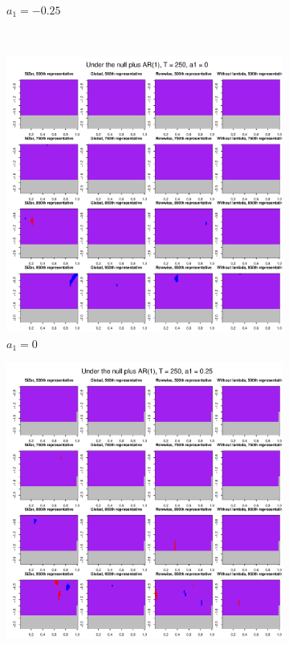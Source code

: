 \documentclass[a4paper,12pt]{article}
\begin{document}
\begin{figure}[t!]
\begin{subfigure}[b]{0.475\textwidth}
\caption{$a_1 = -0.25$}
\end{subfigure}\\
\begin{subfigure}[b]{0.475\textwidth}
\includegraphics[width=\textwidth]{Plots/representatives_T_250_a1_0_slope_0.pdf}
\caption{$a_1 = 0$}
\end{subfigure}\hspace{0.25cm}
\begin{subfigure}[b]{0.475\textwidth}
\includegraphics[width=\textwidth]{Plots/representatives_T_250_a1_25_slope_0.pdf}

\end{subfigure}
\end{figure}
\end{document}

